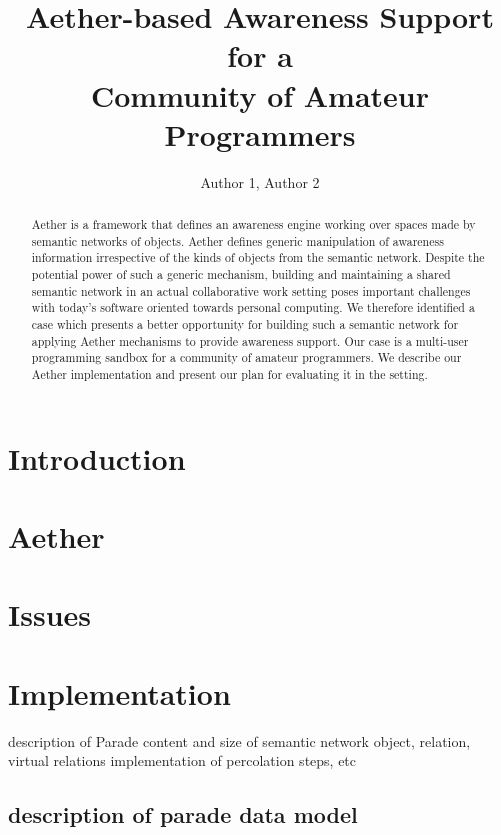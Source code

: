 \documentclass{ecscw2007}
\title{Aether-based Awareness Support for a\\Community of Amateur Programmers}
\author{Author 1, Author 2}
\affiliation{Institute 1, Country, Institute 2, Country}
\begin{document}
\maketitle
\thispagestyle{empty}


\begin{abstract}
Aether is a framework that defines an awareness engine working over spaces made by semantic networks of objects. Aether defines generic manipulation of awareness information irrespective of the kinds of objects from the semantic network. Despite the potential power of such a generic mechanism, building and maintaining a shared semantic network in an actual collaborative work setting poses important challenges with today's software oriented towards personal computing. We therefore identified a case which presents a better opportunity for building such a semantic network for applying Aether mechanisms to provide awareness support. Our case is a multi-user programming sandbox for a community of amateur programmers. We describe our Aether implementation and present our plan for evaluating it in the setting.
\end{abstract}

\section*{Introduction} 

\cite{Bowers91}

\section*{Aether} 

\section*{Issues} 

\section*{Implementation} 
description of Parade
content and size of semantic network
object, relation, virtual relations
implementation of percolation steps, etc


\subsection*{description of parade data model}
\end{document}
